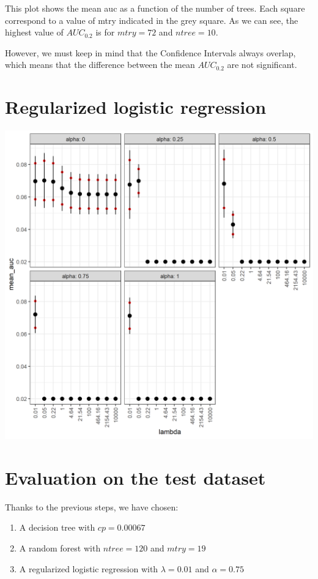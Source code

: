 \documentclass[
  12pt,
  oneside]{report}
\begin{document}
This plot shows the mean auc as a function of the number of trees. Each square correspond to a value of mtry indicated in the grey square. As we can see, the highest value of \(AUC_{0.2}\) is for \(mtry = 72\) and \(ntree = 10\).

However, we must keep in mind that the Confidence Intervals always overlap, which means that the difference between the mean \(AUC_{0.2}\) are not significant.

\hypertarget{regularized-logistic-regression}{%
\section{Regularized logistic regression}\label{regularized-logistic-regression}}

\includegraphics[width=29.17in]{data/cv_lr}

\hypertarget{evaluation-on-the-test-dataset}{%
\section{Evaluation on the test dataset}\label{evaluation-on-the-test-dataset}}

Thanks to the previous steps, we have chosen:

\begin{enumerate}
\def\labelenumi{\arabic{enumi}.}
\item
  A decision tree with \(cp = 0.00067\)
\item
  A random forest with \(ntree = 120\) and \(mtry = 19\)
\item
  A regularized logistic regression with \(\lambda = 0.01\) and \(\alpha = 0.75\)
\end{enumerate}
\end{document}
